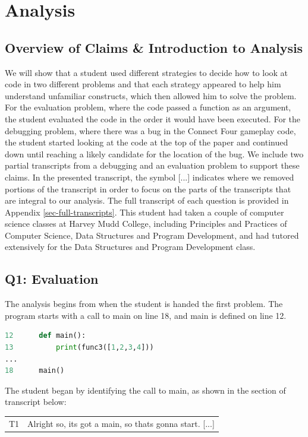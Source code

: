 \section{Analysis}
\subsection{Overview of Claims \& Introduction to Analysis}

We will show that a student used different strategies to decide how to look at code in two different problems and that each strategy appeared to help him understand unfamiliar constructs, which then allowed him to solve the problem.
For the evaluation problem, where the code passed a function as an argument, the student evaluated the code in the order it would have been executed.
For the debugging problem, where there was a bug in the Connect Four gameplay code, the student started looking at the code at the top of the paper and continued down until reaching a likely candidate for the location of the bug.
We include two partial transcripts from a debugging and an evaluation problem to support these claims. 
In the presented transcript, the symbol [...] indicates where we removed portions of the transcript in order to focus on the parts of the transcripts that are integral to our analysis. 
The full transcript of each question is provided in Appendix \ref{sec-full-transcripts}. 
This student had taken a couple of computer science classes at Harvey Mudd College, including Principles and Practices of Computer Science, Data Structures and Program Development, and had tutored extensively for the Data Structures and Program Development class.

\subsection{Q1: Evaluation}

The analysis begins from when the student is handed the first problem.
The program starts with a call to main on line 18, and main is defined on line 12.

\begin{lstlisting}[language=python]
12		def main():
13			print(func3([1,2,3,4]))
...
18		main()
\end{lstlisting}

The student began by identifying the call to main, as shown in the section of transcript below:

\begin{tabular}{lp{13cm}}
T1&Alright so, its got a main, so thats gonna start. [...]\\
\end{tabular}

